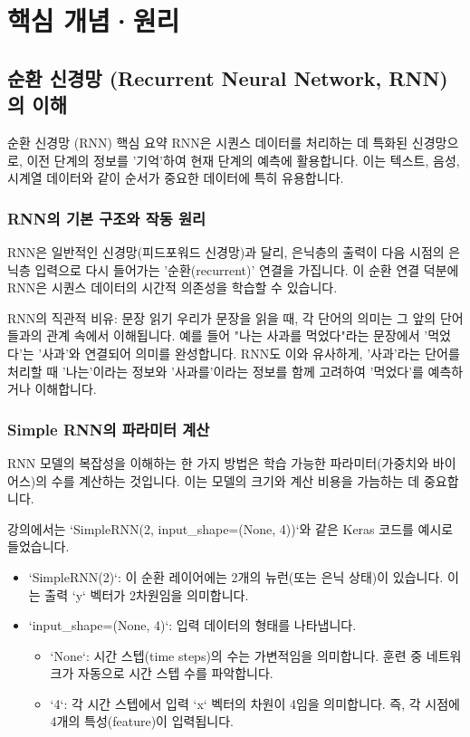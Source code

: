 \documentclass[11pt,a4paper]{article}
\begin{document}
\newpage
\section*{핵심 개념·원리}

\subsection{순환 신경망 (Recurrent Neural Network, RNN)의 이해}
\begin{summarybox}{순환 신경망 (RNN) 핵심 요약}
RNN은 시퀀스 데이터를 처리하는 데 특화된 신경망으로, 이전 단계의 정보를 '기억'하여 현재 단계의 예측에 활용합니다. 이는 텍스트, 음성, 시계열 데이터와 같이 순서가 중요한 데이터에 특히 유용합니다.
\end{summarybox}

\subsubsection{RNN의 기본 구조와 작동 원리}
RNN은 일반적인 신경망(피드포워드 신경망)과 달리, 은닉층의 출력이 다음 시점의 은닉층 입력으로 다시 들어가는 '순환(recurrent)' 연결을 가집니다. 이 순환 연결 덕분에 RNN은 시퀀스 데이터의 시간적 의존성을 학습할 수 있습니다.

\begin{examplebox}{RNN의 직관적 비유: 문장 읽기}
우리가 문장을 읽을 때, 각 단어의 의미는 그 앞의 단어들과의 관계 속에서 이해됩니다. 예를 들어 "나는 사과를 먹었다"라는 문장에서 '먹었다'는 '사과'와 연결되어 의미를 완성합니다. RNN도 이와 유사하게, '사과'라는 단어를 처리할 때 '나는'이라는 정보와 '사과를'이라는 정보를 함께 고려하여 '먹었다'를 예측하거나 이해합니다.
\end{examplebox}

\subsubsection{Simple RNN의 파라미터 계산}
RNN 모델의 복잡성을 이해하는 한 가지 방법은 학습 가능한 파라미터(가중치와 바이어스)의 수를 계산하는 것입니다. 이는 모델의 크기와 계산 비용을 가늠하는 데 중요합니다.

강의에서는 `SimpleRNN(2, input_shape=(None, 4))`와 같은 Keras 코드를 예시로 들었습니다.
\begin{itemize}
    \item `SimpleRNN(2)`: 이 순환 레이어에는 2개의 뉴런(또는 은닉 상태)이 있습니다. 이는 출력 `y` 벡터가 2차원임을 의미합니다.
    \item `input_shape=(None, 4)`: 입력 데이터의 형태를 나타냅니다.
        \begin{itemize}
            \item `None`: 시간 스텝(time steps)의 수는 가변적임을 의미합니다. 훈련 중 네트워크가 자동으로 시간 스텝 수를 파악합니다.
            \item `4`: 각 시간 스텝에서 입력 `x` 벡터의 차원이 4임을 의미합니다. 즉, 각 시점에 4개의 특성(feature)이 입력됩니다.
        \end{itemize}
\end{itemize}
\end{document}
